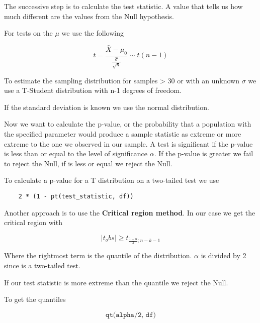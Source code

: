\vspace{10pt}

The successive step is to calculate the test statistic. A value that tells us how much different are the values from the Null hypothesis.

For tests on the $\mu$ we use the following

\begin{equation*}
    t = \frac{\bar{X}-\mu_0}{\frac{\hat{\sigma}}{\sqrt{n}}} \sim t(n-1)
\end{equation*}


\vspace{10pt}

To estimate the sampling distribution for samples > 30 or with an unknown $\sigma$ we use a T-Student distribution with n-1 degrees of freedom.

If the standard deviation is known we use the normal distribution.

\vspace{10pt}

Now we want to calculate the p-value, or the probability that a population with the specified parameter would produce a sample statistic as extreme or more extreme to the one we observed in our sample. 
A test is significant if the p-value is less than or equal to the level of significance $\alpha$. If the p-value is greater we fail to reject the Null, if is less or equal we reject the Null.

To calculate a p-value for a T distribution on a two-tailed test we use

\begin{verbatim}
    2 * (1 - pt(test_statistic, df))
\end{verbatim}

\vspace{10pt}

Another approach is to use the \textbf{Critical region method}. In our case we get the critical region with

\begin{equation*}
    |t_obs| \geq t_{\frac{1-\alpha}{2};n-k-1}
\end{equation*}
 
Where the rightmost term is the quantile of the distribution. $\alpha$ is divided by 2 since is a two-tailed test.

If our test statistic is more extreme than the quantile we reject the Null.

To get the quantiles

\[
\texttt{qt(alpha/2, df)}
\]


